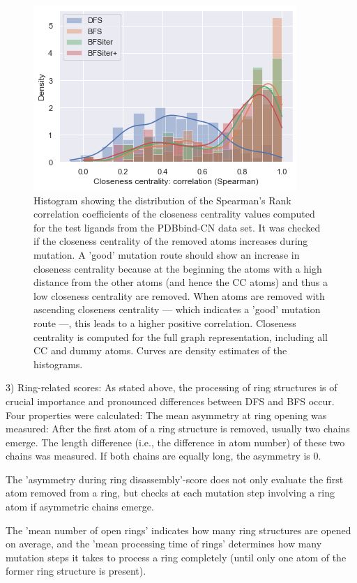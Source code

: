 \begin{figure}[H]
	
	\includegraphics[scale=1.2]{closeness_spearman}
    \caption{Histogram showing the distribution of the Spearman's Rank correlation coefficients of the closeness centrality values computed for the test ligands from the PDBbind-CN data set. It was checked if the closeness centrality of the removed atoms increases during mutation. A 'good' mutation route should show an increase in closeness
centrality because at the beginning the atoms with a high distance
from the other atoms (and hence the CC atoms) and thus a low closeness centrality are removed. When atoms are removed with ascending closeness centrality --- which indicates a 'good' mutation route ---, this leads to a higher positive correlation.  Closeness centrality is computed for the full graph representation, including all CC and dummy atoms. Curves are density estimates of the histograms.}
	\label{fig:closeness_centrality}
\end{figure}


3) Ring-related scores: As stated above, the processing of ring structures
is of crucial importance and pronounced differences between DFS and
BFS occur. Four properties were calculated: The mean asymmetry at
ring opening was measured: After the first atom of a ring structure
is removed, usually two chains emerge. The length difference (i.e.,
the difference in atom number) of these two chains was measured. If
both chains are equally long, the asymmetry is 0. 

The 'asymmetry during ring disassembly'-score does not only evaluate
the first atom removed from a ring, but checks at each mutation step
involving a ring atom if asymmetric chains emerge.

The 'mean number of open rings' indicates how many ring structures
are opened on average, and the 'mean processing time of rings' determines
how many mutation steps it takes to process a ring completely (until
only one atom of the former ring structure is present).

